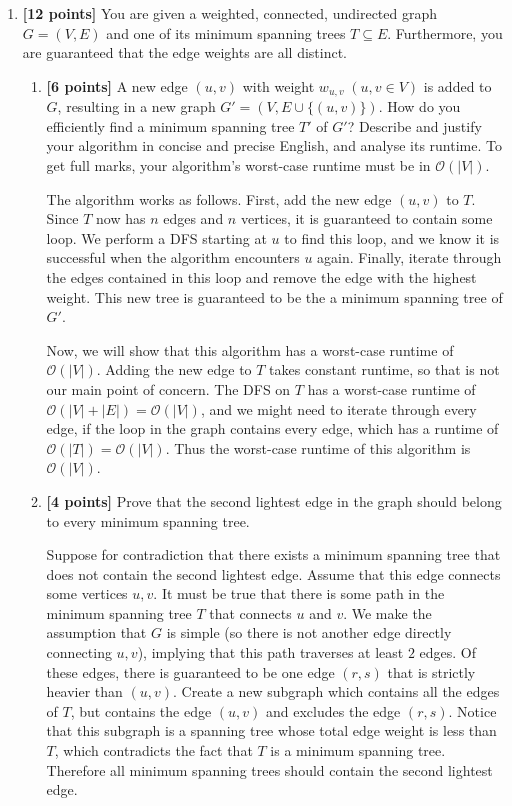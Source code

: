\documentclass{assignment-263}
\begin{document}
\think
\begin{enumerate}
\item \textbf{[12 points]}
	You are given a weighted, connected, undirected graph $G=(V, E)$ and
    one of its minimum spanning trees $T\subseteq E$. Furthermore, you are guaranteed that the edge weights are all distinct.

    \begin{enumerate}
      \item \textbf{[6 points]}
        A new edge $(u, v)$ with weight $w_{u, v}\;(u, v\in V)$ is
        added to $G$, resulting in a new graph $G'=(V, E\cup \{(u,
        v)\})$. How do you efficiently find a minimum spanning tree
        $T'$ of $G'$? Describe and justify your algorithm in concise
        and precise English, and analyse its runtime. To get full
        marks, your algorithm's worst-case runtime must be in
        $\mathcal{O}(|V|)$.

      The algorithm works as follows. First, add the new edge \((u,v)\) to \(T\). Since \(T\) now has \(n\) edges and \(n\) vertices, it is guaranteed to contain some loop. We perform a DFS starting at \(u\) to find this loop, and we know it is successful when the algorithm encounters \(u\) again. Finally, iterate through the edges contained in this loop and remove the edge with the highest weight. This new tree is guaranteed to be the a minimum spanning tree of \(G'\).

      Now, we will show that this algorithm has a worst-case runtime of \(\mathcal{O} (|V|)\). Adding the new edge to \(T\) takes constant runtime, so that is not our main point of concern. The DFS on \(T\) has a worst-case runtime of \(\mathcal{O} (|V| + |E|) = \mathcal{O} (|V|)\), and we might need to iterate through every edge, if the loop in the graph contains every edge, which has a runtime of \(\mathcal{O} (|T|) = \mathcal{O} (|V|)\). Thus the worst-case runtime of this algorithm is \(\mathcal{O} (|V|)\).

      \item \textbf{[4 points]} Prove that the second lightest edge in the graph should belong to every minimum spanning tree.
      
      Suppose for contradiction that there exists a minimum spanning tree that does not contain the second lightest edge. Assume that this edge connects some vertices \(u,v\). It must be true that there is some path in the minimum spanning tree \(T\) that connects \(u\) and \(v\). We make the assumption that \(G\) is simple (so there is not another edge directly connecting \(u,v\)), implying that this path traverses at least \(2\) edges. Of these edges, there is guaranteed to be one edge \((r,s)\) that is strictly heavier than \((u,v)\). Create a new subgraph which contains all the edges of \(T\), but contains the edge \((u,v)\) and excludes the edge \((r,s)\). Notice that this subgraph is a spanning tree whose total edge weight is less than \(T\), which contradicts the fact that \(T\) is a minimum spanning tree. Therefore all minimum spanning trees should contain the second lightest edge.
      

\end{enumerate}
\end{enumerate}
\end{document}
